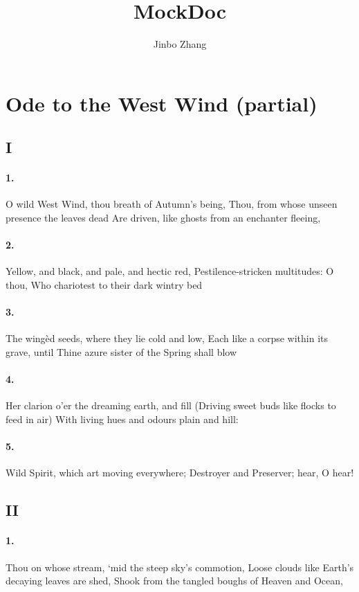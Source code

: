 \documentclass{article}
\author{Jinbo Zhang}
\title{MockDoc}
\begin{document}
	\maketitle
	\section{Ode to the West Wind (partial)}
		\subsection{I}
			\paragraph{1.}
				O wild West Wind, thou breath of Autumn’s being,
				Thou, from whose unseen presence the leaves dead
				Are driven, like ghosts from an enchanter fleeing,
			\paragraph{2.}
				Yellow, and black, and pale, and hectic red,
				Pestilence-stricken multitudes: O thou,
				Who chariotest to their dark wintry bed
			\paragraph{3.}
				The wingèd seeds, where they lie cold and low,
				Each like a corpse within its grave, until
				Thine azure sister of the Spring shall blow
			\paragraph{4.}
				Her clarion o’er the dreaming earth, and fill
				(Driving sweet buds like flocks to feed in air)
				With living hues and odours plain and hill:
			\paragraph{5.}
				Wild Spirit, which art moving everywhere;
				Destroyer and Preserver; hear, O hear!
		\subsection{II}
			\paragraph{1.}
				Thou on whose stream, ‘mid the steep sky’s commotion,
				Loose clouds like Earth’s decaying leaves are shed,
				Shook from the tangled boughs of Heaven and Ocean,
\end{document}
